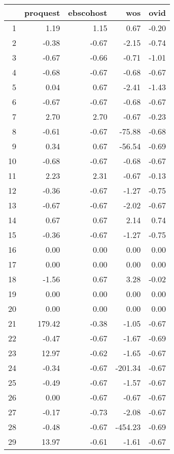 \begin{table}[ht]
\centering
\begin{tabular}{rrrrr}
  \hline
 & proquest & ebscohost & wos & ovid \\ 
  \hline
1 & 1.19 & 1.15 & 0.67 & -0.20 \\ 
  2 & -0.38 & -0.67 & -2.15 & -0.74 \\ 
  3 & -0.67 & -0.66 & -0.71 & -1.01 \\ 
  4 & -0.68 & -0.67 & -0.68 & -0.67 \\ 
  5 & 0.04 & 0.67 & -2.41 & -1.43 \\ 
  6 & -0.67 & -0.67 & -0.68 & -0.67 \\ 
  7 & 2.70 & 2.70 & -0.67 & -0.23 \\ 
  8 & -0.61 & -0.67 & -75.88 & -0.68 \\ 
  9 & 0.34 & 0.67 & -56.54 & -0.69 \\ 
  10 & -0.68 & -0.67 & -0.68 & -0.67 \\ 
  11 & 2.23 & 2.31 & -0.67 & -0.13 \\ 
  12 & -0.36 & -0.67 & -1.27 & -0.75 \\ 
  13 & -0.67 & -0.67 & -2.02 & -0.67 \\ 
  14 & 0.67 & 0.67 & 2.14 & 0.74 \\ 
  15 & -0.36 & -0.67 & -1.27 & -0.75 \\ 
  16 & 0.00 & 0.00 & 0.00 & 0.00 \\ 
  17 & 0.00 & 0.00 & 0.00 & 0.00 \\ 
  18 & -1.56 & 0.67 & 3.28 & -0.02 \\ 
  19 & 0.00 & 0.00 & 0.00 & 0.00 \\ 
  20 & 0.00 & 0.00 & 0.00 & 0.00 \\ 
  21 & 179.42 & -0.38 & -1.05 & -0.67 \\ 
  22 & -0.47 & -0.67 & -1.67 & -0.69 \\ 
  23 & 12.97 & -0.62 & -1.65 & -0.67 \\ 
  24 & -0.34 & -0.67 & -201.34 & -0.67 \\ 
  25 & -0.49 & -0.67 & -1.57 & -0.67 \\ 
  26 & 0.00 & -0.67 & -0.67 & -0.67 \\ 
  27 & -0.17 & -0.73 & -2.08 & -0.67 \\ 
  28 & -0.48 & -0.67 & -454.23 & -0.69 \\ 
  29 & 13.97 & -0.61 & -1.61 & -0.67 \\ 
   \hline
\end{tabular}
\end{table}

